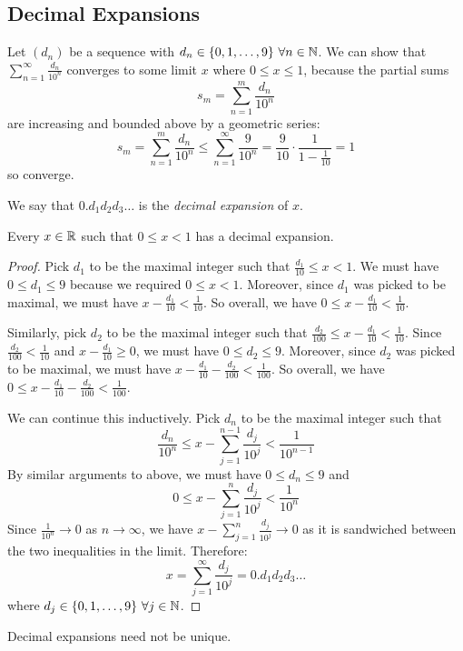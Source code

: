 \documentclass[../main.tex]{subfiles}
\begin{document}
\subsection{Decimal Expansions}
Let $(d_n)$ be a sequence with $d_n \in \{0, 1, \ldots, 9\}\ \forall n \in \mathbb{N}$.
We can show that $\sum_{n = 1}^{\infty} \frac{d_n}{10^{n}}$ converges to some limit $x$ where $0 \leq x \leq 1$, because the partial sums
\[
  s_m = \sum_{n=1}^{m} \frac{d_n}{10^{n}}
\]
are increasing and bounded above by a geometric series:
\[
  s_m = \sum_{n=1}^{m} \frac{d_n}{10^{n}} \leq \sum_{n=1}^{\infty} \frac{9}{10^{n}} = \frac{9}{10} \cdot \frac{1}{1 - \frac{1}{10}} = 1
\]
so converge.

We say that $0.d_1d_2d_3\ldots$ is the \textit{decimal expansion} of $x$.
\begin{proposition}
  Every $x \in \mathbb{R}$ such that $0 \leq x < 1$ has a decimal expansion.
\end{proposition}
\begin{proof}
  Pick $d_1$ to be the maximal integer such that $\frac{d_1}{10} \leq x < 1$.
  We must have $0 \leq d_1 \leq 9$ because we required $0 \leq x < 1$.
  Moreover, since $d_1$ was picked to be maximal, we must have $x - \frac{d_1}{10} < \frac{1}{10}$.
  So overall, we have $0 \leq x- \frac{d_1}{10} < \frac{1}{10}$.

  Similarly, pick $d_2$ to be the maximal integer such that $\frac{d_2}{100} \leq x - \frac{d_1}{10} < \frac{1}{10}$.
  Since $\frac{d_2}{100} < \frac{1}{10}$  and $x - \frac{d_1}{10} \geq 0$, we must have $0 \leq d_2 \leq 9$.
  Moreover, since $d_2$ was picked to be maximal, we must have $x - \frac{d_1}{10} - \frac{d_2}{100} < \frac{1}{100}$.
  So overall, we have $0 \leq x - \frac{d_1}{10} - \frac{d_2}{100} < \frac{1}{100}$.

  We can continue this inductively.
  Pick $d_n$ to be the maximal integer such that
  \[
    \frac{d_n}{10^{n}} \leq x - \sum_{j = 1}^{n - 1} \frac{d_j}{10^{j}} < \frac{1}{10^{n -1}}
  \]
  By similar arguments to above, we must have $0 \leq d_n \leq 9$ and
  \[
    0 \leq x - \sum_{j = 1}^{n} \frac{d_j}{10^{j}} < \frac{1}{10^{n}}
  \]
  Since $\frac{1}{10^{n}} \to 0$ as $n \to \infty$, we have $x - \sum_{j = 1}^{n} \frac{d_j}{10^{j}} \to 0$ as it is sandwiched between the two inequalities in the limit.
  Therefore:
  \[
    x = \sum_{j=1}^{\infty} \frac{d_j}{10^{j}}= 0.d_1d_2d_3\ldots
  \]
  where $d_j \in \{0, 1, \ldots, 9\}\ \forall j \in \mathbb{N}$.
\end{proof}
\begin{proposition}
  Decimal expansions need not be unique.
  \label{decimalExpansionUniqueness}
\end{proposition}
\end{document}
